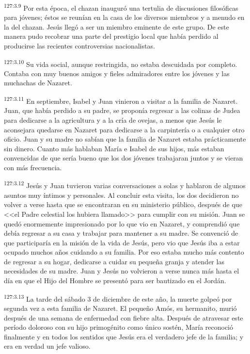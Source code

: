 \par 
\textsuperscript{127:3.9} Por esta época, el chazan inauguró una tertulia de discusiones filosóficas para jóvenes; éstos se reunían en la casa de los diversos miembros y a menudo en la del chazan. Jesús llegó a ser un miembro eminente de este grupo. De este manera pudo recobrar una parte del prestigio local que había perdido al producirse las recientes controversias nacionalistas.

\par 
\textsuperscript{127:3.10} Su vida social, aunque restringida, no estaba descuidada por completo. Contaba con muy buenos amigos y fieles admiradores entre los jóvenes y las muchachas de Nazaret.

\par 
\textsuperscript{127:3.11} En septiembre, Isabel y Juan vinieron a visitar a la familia de Nazaret. Juan, que había perdido a su padre, se proponía regresar a las colinas de Judea para dedicarse a la agricultura y a la cría de ovejas, a menos que Jesús le aconsejara quedarse en Nazaret para dedicarse a la carpintería o a cualquier otro oficio. Juan y su madre no sabían que la familia de Nazaret estaba prácticamente sin dinero. Cuanto más hablaban María e Isabel de sus hijos, más estaban convencidas de que sería bueno que los dos jóvenes trabajaran juntos y se vieran con más frecuencia.

\par 
\textsuperscript{127:3.12} Jesús y Juan tuvieron varias conversaciones a solas y hablaron de algunos asuntos muy íntimos y personales. Al concluir esta visita, los dos decidieron no volver a verse hasta que se encontraran en su ministerio público, después de que <<el Padre celestial los hubiera llamado>> para cumplir con su misión. Juan se quedó enormemente impresionado por lo que vio en Nazaret, y comprendió que debía regresar a su casa y trabajar para mantener a su madre. Se convenció de que participaría en la misión de la vida de Jesús, pero vio que Jesús iba a estar ocupado muchos años cuidando a su familia. Por eso estaba mucho más contento de regresar a su hogar, dedicarse a cuidar su pequeña granja y atender las necesidades de su madre. Juan y Jesús no volvieron a verse nunca más hasta el día en que el Hijo del Hombre se presentó para ser bautizado en el Jordán.

\par 
\textsuperscript{127:3.13} La tarde del sábado 3 de diciembre de este año, la muerte golpeó por segunda vez a esta familia de Nazaret. El pequeño Amós, su hermanito, murió después de una semana de enfermedad con fiebre alta. Después de atravesar este período doloroso con su hijo primogénito como único sostén, María reconoció finalmente y en todos los sentidos que Jesús era el verdadero jefe de la familia; y era en verdad un jefe valioso.

